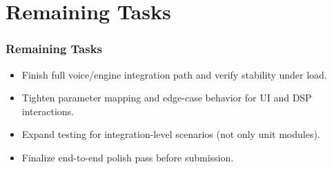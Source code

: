 \section{Remaining Tasks}

\begin{frame}\frametitle{Remaining Tasks}
\begin{itemize} [<+->]
    \item Finish full voice/engine integration path and verify stability under load.
    \item Tighten parameter mapping and edge-case behavior for UI and DSP interactions.
    \item Expand testing for integration-level scenarios (not only unit modules).
    \item Finalize end-to-end polish pass before submission.
\end{itemize}
\end{frame}

